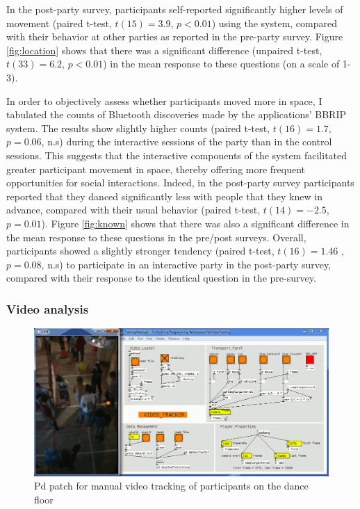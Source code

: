 \documentclass[a4paper,11pt]{article}
\begin{document}
{In the post-party survey, participants self-reported significantly higher levels of movement (paired t-test, $t(15)=3.9$, $p<0.01$) using the system, compared with their behavior at other parties as reported in the pre-party survey.
Figure \ref{fig:location} shows that there was a significant difference (unpaired t-test, $t(33)=6.2$, $p<0.01$) in the mean response to these questions (on a scale of 1-3).

In order to objectively assess whether participants moved more in space, I tabulated the counts of Bluetooth discoveries made by the applications' BBRIP system.
The results show slightly higher counts (paired t-test, $t(16)=1.7$, $p=0.06$, n.s) during the interactive sessions of the party than in the control sessions.
This suggests that the interactive components of the system facilitated greater participant movement in space, thereby offering more frequent opportunities for social interactions.
Indeed, in the post-party survey participants reported that they danced significantly less with people that they knew in advance, compared with their usual behavior (paired t-test, $t(14)=-2.5$, $p=0.01$).
Figure \ref{fig:known} shows that there was also a significant difference in the mean response to these questions in the pre/post surveys.
Overall, participants showed a slightly stronger tendency (paired t-test, $t(16)=1.46$ ,$p=0.08$, n.s) to participate in an interactive party in the post-party survey, compared with their response to the identical question in the pre-survey.

\subsubsection{Video analysis}\label{exp1:results:video}

\begin{figure}[!htb]
	\includegraphics[width=\linewidth]{tracking}
        \caption{Pd patch for manual video tracking of participants on the dance floor}\label{fig:tracking}
\end{figure}

}
\end{document}
